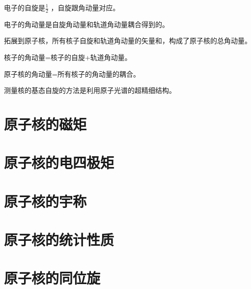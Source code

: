 电子的自旋是$\frac{1}{2}$ ，自旋跟角动量对应。

电子的角动量是自旋角动量和轨道角动量耦合得到的。

拓展到原子核，所有核子自旋和轨道角动量的矢量和，构成了原子核的总角动量。

核子的角动量=核子的自旋+轨道角动量。

原子核的角动量=所有核子的角动量的耦合。

测量核的基态自旋的方法是利用原子光谱的超精细结构。

\section{原子核的磁矩}

\section{原子核的电四极矩}

\section{原子核的宇称}

\section{原子核的统计性质}

\section{原子核的同位旋}

\clearpage